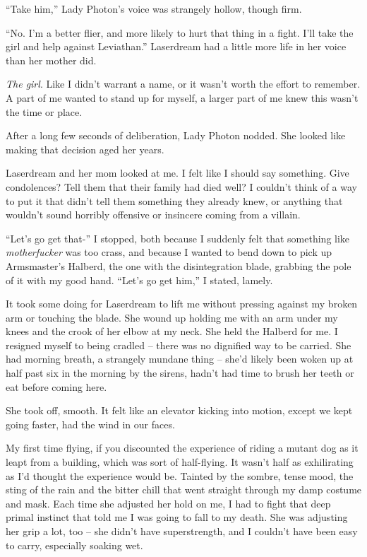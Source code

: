``Take him,'' Lady Photon's voice was strangely hollow, though firm.



``No.  I'm a better flier, and more likely to hurt that thing in a fight.  I'll take the girl and help against Leviathan.''  Laserdream had a little more life in her voice than her mother did.



\emph{The girl}.  Like I didn't warrant a name, or it wasn't worth the effort to remember.  A part of me wanted to stand up for myself, a larger part of me knew this wasn't the time or place.



After a long few seconds of deliberation, Lady Photon nodded.  She looked like making that decision aged her years.



Laserdream and her mom looked at me.  I felt like I should say something.  Give condolences?  Tell them that their family had died well?  I couldn't think of a way to put it that didn't tell them something they already knew, or anything that wouldn't sound horribly offensive or insincere coming from a villain.



``Let's go get that-'' I stopped, both because I suddenly felt that something like \emph{motherfucker} was too crass, and because I wanted to bend down to pick up Armsmaster's Halberd, the one with the disintegration blade, grabbing the pole of it with my good hand. ``Let's go get him,'' I stated, lamely.



It took some doing for Laserdream to lift me without pressing against my broken arm or touching the blade. She wound up holding me with an arm under my knees and the crook of her elbow at my neck.  She held the Halberd for me.  I resigned myself to being cradled – there was no dignified way to be carried.  She had morning breath, a strangely mundane thing – she'd likely been woken up at half past six in the morning by the sirens, hadn't had time to brush her teeth or eat before coming here.



She took off, smooth.  It felt like an elevator kicking into motion, except we kept going faster, had the wind in our faces.



My first time flying, if you discounted the experience of riding a mutant dog as it leapt from a building, which was sort of half-flying.  It wasn't half as exhilirating as I'd thought the experience would be.  Tainted by the sombre, tense mood, the sting of the rain and the bitter chill that went straight through my damp costume and mask.  Each time she adjusted her hold on me, I had to fight that deep primal instinct that told me I was going to fall to my death.  She was adjusting her grip a lot, too – she didn't have superstrength, and I couldn't have been easy to carry, especially soaking wet.



